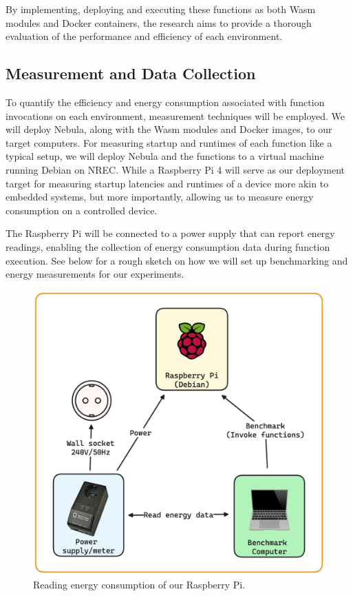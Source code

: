 \documentclass[
  table]{report}
\begin{document}
By implementing, deploying and executing these functions as both
\ac{Wasm} modules and Docker containers, the research aims to provide a
thorough evaluation of the performance and efficiency of each
environment.

\subsection{Measurement and Data Collection}
\label{sect:measure_data_collect}

To quantify the efficiency and energy consumption associated with
function invocations on each environment, measurement techniques will be
employed. We will deploy Nebula, along with the \ac{Wasm} modules and
Docker images, to our target computers. For measuring startup and
runtimes of each function like a typical setup, we will deploy Nebula
and the functions to a virtual machine running Debian on \ac{NREC}.
While a Raspberry Pi 4 will serve as our deployment target for measuring
startup latencies and runtimes of a device more akin to embedded
systems, but more importantly, allowing us to measure energy consumption
on a controlled device.

The Raspberry Pi will be connected to a power supply that can report
energy readings, enabling the collection of energy consumption data
during function execution. See  below for a
rough sketch on how we will set up benchmarking and energy measurements
for our experiments.

\begin{figure}[H]
\centering
  \includegraphics[width=0.7\columnwidth]{assets/4-benchmark-setup.png}
  \caption{Reading energy consumption of our Raspberry Pi.}
  \label{fig:benchmark-setup}
\end{figure}
\end{document}
